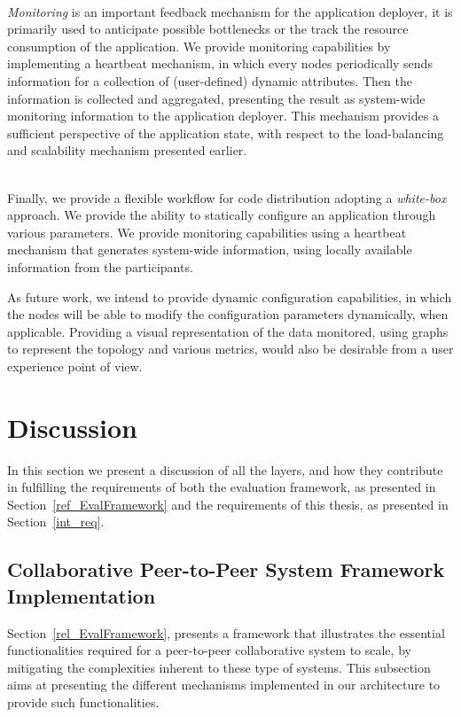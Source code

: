 \documentclass[12pt, titlepage]{uo_temp}
\begin{document}
     \\ \emph{Monitoring} is an important feedback mechanism for the application deployer,
     it is primarily used to anticipate possible bottlenecks or the track the resource
     consumption of the application. We provide monitoring capabilities by implementing a
     heartbeat mechanism, in which every nodes periodically sends information for a
     collection of (user-defined) dynamic attributes. Then the information is collected
     and aggregated, presenting the result as system-wide monitoring information to the
     application deployer. This mechanism provides a sufficient perspective of the
     application state, with respect to the load-balancing and scalability mechanism
     presented earlier.
 
     \\ Finally, we provide a flexible workflow for code distribution adopting a
     \emph{white-box} approach. We provide the ability to statically configure an
     application through various parameters. We provide monitoring capabilities using a
     heartbeat mechanism that generates system-wide information, using locally available
     information from the participants.

     As future work, we intend to provide dynamic configuration capabilities, in which the
     nodes will be able to modify the configuration parameters dynamically, when
     applicable. Providing a visual representation of the data monitored, using graphs to
     represent the topology and various metrics, would also be desirable from a user
     experience point of view.

     \section{Discussion}
     In this section we present a discussion of all the layers, and how they contribute in
     fulfilling the requirements of both the evaluation framework, as presented in
     Section~\ref{ref_EvalFramework} and the requirements of this thesis, as
     presented in Section~\ref{int_req}.
     
     \subsection{Collaborative Peer-to-Peer System Framework Implementation}
     Section~\ref{rel_EvalFramework}, presents a framework that illustrates the essential
     functionalities required for a peer-to-peer collaborative system to scale, by
     mitigating the complexities inherent to these type of systems. This subsection aims
     at presenting the different mechanisms implemented in our architecture to provide
     such functionalities.
\end{document}
